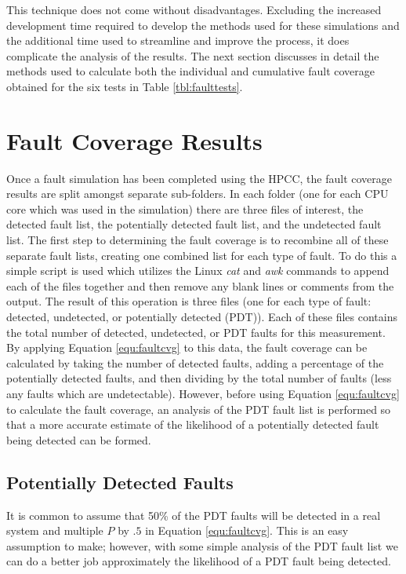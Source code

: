 \documentclass[12pt]{report}
\begin{document}
This technique does not come without disadvantages.  Excluding the increased development time required to develop the methods used for these simulations and the additional time used to streamline and improve the process, it does complicate the analysis of the results.  The next section discusses in detail the methods used to calculate both the individual and cumulative fault coverage obtained for the six tests in Table \ref{tbl:faulttests}.

\section{Fault Coverage Results}
Once a fault simulation has been completed using the HPCC, the fault coverage results are split amongst separate sub-folders.  In each folder (one for each CPU core which was used in the simulation) there are three files of interest, the detected fault list, the potentially detected fault list, and the undetected fault list.  The first step to determining the fault coverage is to recombine all of these separate fault lists, creating one combined list for each type of fault.  To do this a simple script is used which utilizes the Linux \textit{cat} and \textit{awk} commands to append each of the files together and then remove any blank lines or comments from the output.  The result of this operation is three files (one for each type of fault: detected, undetected, or potentially detected (PDT)).  Each of these files contains the total number of detected, undetected, or PDT faults for this measurement.  By applying Equation \ref{equ:faultcvg} to this data, the fault coverage can be calculated by taking the number of detected faults, adding a percentage of the potentially detected faults, and then dividing by the total number of faults (less any faults which are undetectable).  However, before using Equation \ref{equ:faultcvg} to calculate the fault coverage, an analysis of the PDT fault list is performed so that a more accurate estimate of the likelihood of a potentially detected fault being detected can be formed.

\subsection{Potentially Detected Faults}
It is common to assume that 50\% of the PDT faults will be detected in a real system and multiple $P$ by $.5$ in Equation \ref{equ:faultcvg}.  This is an easy assumption to make; however, with some simple analysis of the PDT fault list we can do a better job approximately the likelihood of a PDT fault being detected.  
\end{document}
